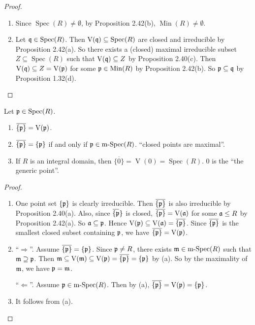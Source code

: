 \begin{proof}
    \begin{enumerate}
        \item Since $\operatorname{Spec}(R) \neq \emptyset$, by Proposition 2.42(b), $\operatorname{Min}(R) \neq \emptyset$.
        \item Let $\mathfrak{q} \in \operatorname{Spec}(R)$. Then $\operatorname{V}(\mathfrak{q}) \subseteq \operatorname{Spec}(R)$ are closed and irreducible by Proposition 2.42(a). So there exists a (closed) maximal irreducible subset $Z \subseteq \operatorname{Spec}(R)$ such that $\operatorname{V}(\mathfrak{q}) \subseteq Z$ by Proposition 2.40(c). Then $\operatorname{V}(\mathfrak{q}) \subseteq Z = \operatorname{V}(\mathfrak{p})$ for some $\mathfrak{p} \in \operatorname{Min}(R)$ by Proposition 2.42(b). So $\mathfrak{p} \subseteq \mathfrak{q}$ by Proposition 1.32(d). \qedhere
    \end{enumerate}
\end{proof}

\begin{proposition}
    Let $\mathfrak{p} \in \operatorname{Spec}(R)$.
    \begin{enumerate}
        \item $\overbar {\{\ffp\}} = \operatorname{V}(\ffp)$.
        \item $\overbar {\{\ffp\}} = \{\ffp\}$ if and only if $\mathfrak{p} \in \operatorname{m-Spec}(R)$. ``closed points are maximal''.
        \item If $R$ is an integral domain, then $\overbar {\{0\}} = \operatorname{V}(0) = \operatorname{Spec}(R)$. 0 is the ``the generic point''.
    \end{enumerate}
\end{proposition}

\begin{proof}
    \begin{enumerate}
        \item 
            One point set $\{\mathfrak{p}\}$ is clearly irreducible. Then $\overbar {\{\ffp\}}$ is also irreducible by Proposition 2.40(a). Also, since $\overbar {\{\ffp}\}$ is closed, $\overbar {\{\ffp\}} = \operatorname{V}(\ffa)$ for some $\mathfrak{a} \leq R$ by Proposition 2.42(a). So $\mathfrak{a} \subseteq \mathfrak{p}$. Hence $\operatorname{V}(\ffp) \subseteq \operatorname{V}(\ffa) = \overbar {\{\ffp\}}$. Since $\overbar {\{\ffp\}}$ is the smallest closed subset containing $\mathfrak{p}$, we have $\overbar {\{\ffp\}} = \operatorname{V}(\ffp)$.
        \item 
            ``$\Rightarrow$''. Assume $\overbar{\{\ffp\}} = \{\ffp\}$. Since $\mathfrak{p} \neq R$, there exists $\mathfrak{m} \in \operatorname{m-Spec}(R)$ such that $\mathfrak{m} \supseteq \mathfrak{p}$. Then $\ffm \subseteq \operatorname{V}(\ffm) \subseteq \operatorname{V}(\ffp) = \overbar {\{\ffp\}} = \{\ffp\}$ by (a). So by the maximality of $\mathfrak{m}$, we have $\mathfrak{p} = \mathfrak{m}$. \par 
            ``$\Leftarrow$''. Assume $\mathfrak{p} \in \operatorname{m-Spec}(R)$. Then by (a), $\overbar {\{\ffp\}} = \operatorname{V}(\ffp) = \{\ffp\}$. 
        \item It follows from (a). \qedhere
    \end{enumerate}
\end{proof}
